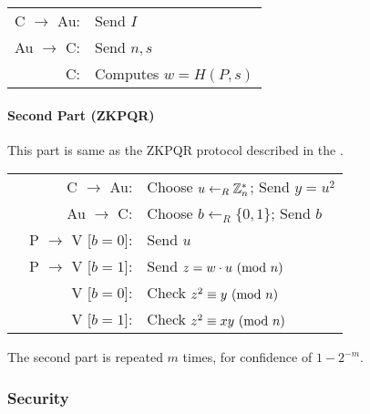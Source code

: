 \bigskip

\begin{center} %
	\begin{tabular}{rl}
	C $\rightarrow$ Au: & Send $I$\\
	Au $\rightarrow$ C: & Send $n, s$\\
	C: & Computes $w = H(P, s)$\\
\end{tabular}
\end{center}

\paragraph{Second Part (ZKPQR)}
This part is same as the ZKPQR protocol described in the \cite{GMR}.

\bigskip

\begin{center}
\begin{tabular}{lrl} %
	& C $\rightarrow$ Au: & Choose $u \leftarrow_R \Bbb{Z}_{n}^{*}$; Send $y = u^2$\\
	& Au $\rightarrow$ C: & Choose $b \leftarrow_R \{0, 1\} $; Send $b$\\
	& P $\rightarrow$ V [$b = 0$]: & Send $u$\\
	& P $\rightarrow$ V [$b = 1$]: & Send $z = w \cdot u \ (\mathrm{mod}\ n)$\\
	& V [$b = 0$]: & Check $z^2 \equiv y \ (\mathrm{mod}\ n)$\\
	& V [$b = 1$]: & Check $z^2 \equiv xy \ (\mathrm{mod}\ n)$\\
\end{tabular}
\end{center}

\bigskip

The second part is repeated $m$ times, for confidence of $1 - 2^{-m}$.

\subsubsection{Security}



